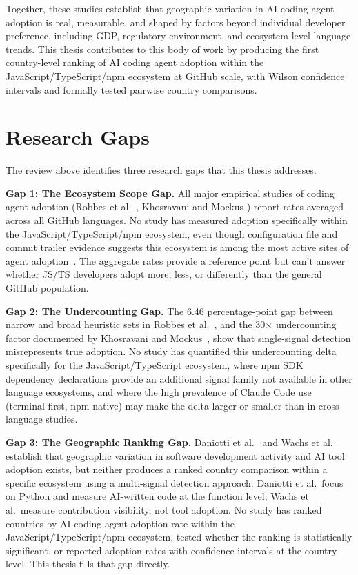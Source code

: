 Together, these studies establish that geographic variation in AI coding agent
adoption is real, measurable, and shaped by factors beyond individual developer
preference, including GDP, regulatory environment, and ecosystem-level language
trends. This thesis contributes to this body of work by producing the first
country-level ranking of AI coding agent adoption within the
JavaScript/TypeScript/npm ecosystem at GitHub scale, with Wilson confidence
intervals and formally tested pairwise country comparisons.

\section{Research Gaps}
\label{sec:lr:gaps}

The review above identifies three research gaps that this thesis addresses.

\textbf{Gap 1: The Ecosystem Scope Gap.}
All major empirical studies of coding agent adoption (Robbes et al.\
\cite{robbesAgenticMuch2026,robbesAgenticVery2026}, Khosravani and Mockus
\cite{khosravani2026}) report rates averaged across all GitHub languages. No
study has measured adoption specifically within the JavaScript/TypeScript/npm
ecosystem, even though configuration file and commit trailer evidence suggests
this ecosystem is among the most active sites of agent adoption~\cite{
galsterConfig2026, octoverse2025}. The aggregate rates provide a reference point
but can't answer whether JS/TS developers adopt more, less, or differently
than the general GitHub population.

\textbf{Gap 2: The Undercounting Gap.}
The 6.46 percentage-point gap between narrow and broad heuristic sets in
Robbes et al.~\cite{robbesAgenticMuch2026}, and the 30$\times$ undercounting
factor documented by Khosravani and Mockus~\cite{khosravani2026}, show that
single-signal detection misrepresents true adoption. No study has quantified
this undercounting delta specifically for the JavaScript/TypeScript ecosystem,
where npm SDK dependency declarations provide an additional signal family not
available in other language ecosystems, and where the high prevalence of Claude
Code use (terminal-first, npm-native) may make the delta larger or smaller than
in cross-language studies.

\textbf{Gap 3: The Geographic Ranking Gap.}
Daniotti et al.~\cite{daniotti2025} and Wachs et al.~\cite{wachs2022} establish
that geographic variation in software development activity and AI tool adoption
exists, but neither produces a ranked country comparison within a specific
ecosystem using a multi-signal detection approach. Daniotti et al.\ focus on
Python and measure AI-written code at the function level; Wachs et al.\ measure
contribution visibility, not tool adoption. No study has ranked countries by AI
coding agent adoption rate within the JavaScript/TypeScript/npm ecosystem, tested
whether the ranking is statistically significant, or reported adoption rates with
confidence intervals at the country level. This thesis fills that gap directly.

